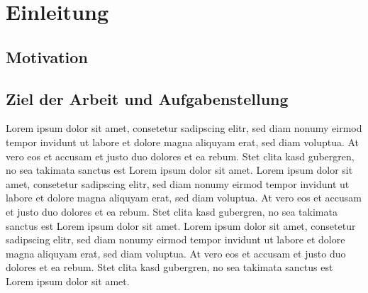 \chapter{Einleitung}
\label{cha:Einleitung}

\section{Motivation}

\section{Ziel der Arbeit und Aufgabenstellung}
Lorem ipsum dolor sit amet, consetetur sadipscing elitr, sed diam nonumy eirmod tempor invidunt ut labore et dolore magna aliquyam erat, sed diam voluptua. At vero eos et accusam et justo duo dolores et ea rebum. Stet clita kasd gubergren, no sea takimata sanctus est Lorem ipsum dolor sit amet. Lorem ipsum dolor sit amet, consetetur sadipscing elitr, sed diam nonumy eirmod tempor invidunt ut labore et dolore magna aliquyam erat, sed diam voluptua. At vero eos et accusam et justo duo dolores et ea rebum. Stet clita kasd gubergren, no sea takimata sanctus est Lorem ipsum dolor sit amet. Lorem ipsum dolor sit amet, consetetur sadipscing elitr, sed diam nonumy eirmod tempor invidunt ut labore et dolore magna aliquyam erat, sed diam voluptua. At vero eos et accusam et justo duo dolores et ea rebum. Stet clita kasd gubergren, no sea takimata sanctus est Lorem ipsum dolor sit amet.   

